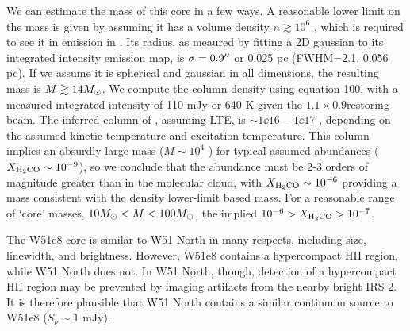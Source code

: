 We can estimate the mass of this core in a few ways.  A reasonable lower limit
on the mass is given by assuming it has a volume density $n\gtrsim10^6$ \percc,
which is required to see it in emission in \ortho \twotwo.  Its radius, as
meaured by fitting a 2D gaussian to its integrated intensity emission map, is
$\sigma=0.9\mbox{$^{\prime\prime}$}$ or 0.025 pc (FWHM=2.1\arcsec, 0.056 pc).  If we assume it
is spherical and gaussian in
all dimensions, the resulting mass is $M\gtrsim14M_{\odot}$.
We compute the \ortho \twotwo column density using \citet{Mangum2015a} equation
100, with a measured integrated intensity of 110 mJy \kms or 640 K \kms given
the $1.1\times0.9$\arcsec restoring beam.  The inferred column of \ortho,
assuming LTE, is $\sim1\ee{16} - 1\ee{17}$ \persc, depending on the assumed
kinetic temperature and excitation temperature.  This \formaldehyde column
implies an absurdly large mass ($M\sim10^4$ \msun) for typical assumed abundances
($X_{\textrm{H}_2\textrm{CO}}\sim10^{-9}$), so we conclude that the \formaldehyde abundance
must be 2-3 orders of magnitude greater than in the molecular cloud, with
$X_{\textrm{H}_2\textrm{CO}}\sim10^{-6}$ providing a mass consistent with the density
lower-limit based mass.  For a reasonable range of `core' masses, $10
M_{\odot}<M<100 M_{\odot}$, the implied $10^{-6} > X_{\textrm{H}_2\textrm{CO}} > 10^{-7}$.

The W51e8 core is similar to W51 North in many respects, including size,
linewidth, and brightness.  However, W51e8 contains a hypercompact HII region,
while W51 North does not.  In W51 North, though, detection of a hypercompact
HII region may be prevented by imaging artifacts from the nearby bright IRS 2.
It is therefore plausible that W51 North contains a similar continuum source to
W51e8 ($S_\nu \sim 1$ mJy).


